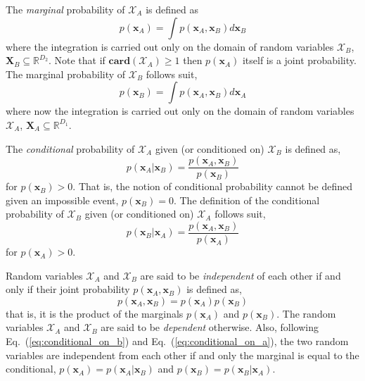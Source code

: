 The \emph{marginal} probability of $\bm{\mathcal{X}}_A$ is defined as
\begin{equation}
  p(\bm{x}_A) = \int p(\bm{x}_A,\bm{x}_B) d\bm{x}_B
\label{eq:marginal_set_a}
\end{equation}
where the integration is carried out only on the domain of random variables $\bm{\mathcal{X}}_B$, $\boldsymbol{X}_B \subseteq \mathbb{R}^{D_2}$. 
Note that if $\mathbf{card}(\bm{\mathcal{X}}_A) \geq 1$ then $p(\bm{x}_A)$ itself is a joint probability.
The marginal probability of $\bm{\mathcal{X}}_B$ follows suit,
\begin{equation}
  p(\bm{x}_B) = \int p(\bm{x}_A,\bm{x}_B) d\bm{x}_A
\label{eq:marginal_set_b}
\end{equation}
where now the integration is carried out only on the domain of random variables $\bm{\mathcal{X}}_A$, $\boldsymbol{X}_A \subseteq \mathbb{R}^{D_1}$.

The \emph{conditional} probability of $\bm{\mathcal{X}}_A$ given (or conditioned on) $\bm{\mathcal{X}}_B$ is defined as,
\begin{equation}
  p(\bm{x}_A|\bm{x}_B) = \frac{p(\bm{x}_A, \bm{x}_B)}{p(\bm{x}_B)}
\label{eq:conditional_on_b}
\end{equation}
for $p(\bm{x}_B) > 0$. That is, the notion of conditional probability cannot be defined given an impossible event, $p(\bm{x}_B) = 0$. 
The definition of the conditional probability of $\bm{\mathcal{X}}_B$ given (or conditioned on) $\bm{\mathcal{X}}_A$ follows suit, 
\begin{equation}
  p(\bm{x}_B|\bm{x}_A) = \frac{p(\bm{x}_A, \bm{x}_B)}{p(\bm{x}_A)}
\label{eq:conditional_on_a}
\end{equation}
for $p(\bm{x}_A) > 0$.

Random variables $\bm{\mathcal{X}}_A$ and $\bm{\mathcal{X}}_B$ are said to be \emph{independent} of each
other if and only if their joint probability $p(\bm{x}_A, \bm{x}_B)$ is defined as,
\begin{equation}
  p(\bm{x}_A, \bm{x}_B) = p(\bm{x}_A) p(\bm{x}_B)
\label{eq:independence}
\end{equation}
that is, it is the product of the marginals $p(\bm{x}_A)$ and $p(\bm{x}_B)$.
The random variables $\bm{\mathcal{X}}_A$ and $\bm{\mathcal{X}}_B$ are said to be \emph{dependent} otherwise.
Also, following Eq.~(\ref{eq:conditional_on_b}) and Eq.~(\ref{eq:conditional_on_a}), the two random variables are independent from each other if and only the marginal is equal to the conditional, $p(\bm{x}_A) = p(\bm{x}_A|\bm{x}_B)$ and $p(\bm{x}_B) = p(\bm{x}_B|\bm{x}_A)$.

